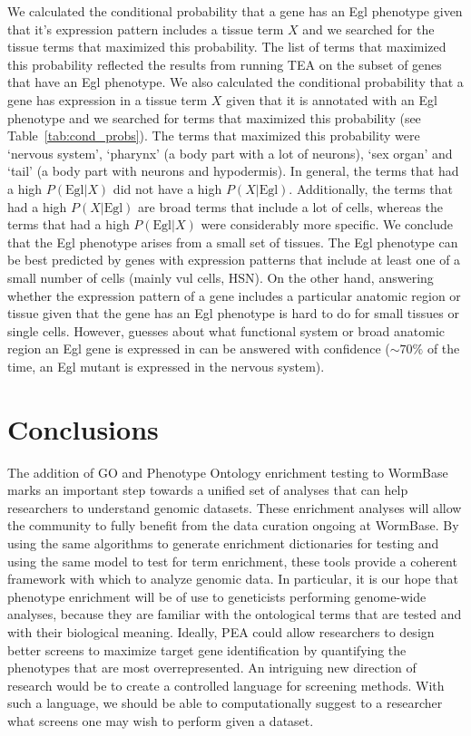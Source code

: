 We calculated the conditional probability that a gene has an Egl phenotype given
that it's expression pattern includes a tissue term $X$ and we searched for the
tissue terms that maximized this probability. The list of terms that maximized this
probability reflected the results from running TEA on the subset of genes that have
an Egl phenotype. We also calculated the conditional probability that a gene has
expression in a tissue term $X$ given that it is annotated with an Egl phenotype
and we searched for terms that maximized this probability (see
Table~\ref{tab:cond_probs}). The terms that maximized this probability were
`nervous system', `pharynx' (a body part with a lot of neurons),
`sex organ' and `tail' (a body part with neurons and hypodermis). In general, the
terms that had a high $P(\text{Egl}|X)$ did not have a high $P(X|\text{Egl})$.
Additionally, the terms that had a high $P(X|\text{Egl})$ are broad terms that
include a lot of cells, whereas the terms that had a high $P(\text{Egl}|X)$
were considerably more specific.
We conclude that the Egl phenotype arises from a small set of tissues. The Egl
phenotype can be best predicted by genes with expression patterns that include
at least one of a small number of cells (mainly vul cells, HSN). On the other
hand, answering whether the expression pattern of a gene includes a particular
anatomic region or tissue given that the gene has an Egl phenotype is hard to
do for small tissues or single cells. However, guesses about what functional system
or broad anatomic region an Egl gene is expressed in can be answered with
confidence ($\sim70\%$ of the time, an Egl mutant is expressed in
the nervous system).

\section*{Conclusions}
The addition of GO and Phenotype Ontology enrichment testing to WormBase marks
an important step towards a unified set of analyses that can help researchers
to understand genomic datasets. These enrichment analyses will allow the community to
fully benefit from the data curation ongoing at WormBase. By using the same
algorithms to generate enrichment dictionaries for testing and using the
same model to test for term enrichment, these tools provide a coherent framework
with which to analyze genomic data. In particular, it is our hope that
phenotype enrichment will be of use to geneticists performing genome-wide
analyses, because they are familiar with the ontological terms that are tested
and with their biological meaning. Ideally, PEA could allow researchers to
design better screens to maximize target gene identification by quantifying
the phenotypes that are most overrepresented. An intriguing new direction of
research would be to create a controlled language for screening methods. With
such a language, we should be able to computationally suggest to a researcher
what screens one may wish to perform given a dataset.
